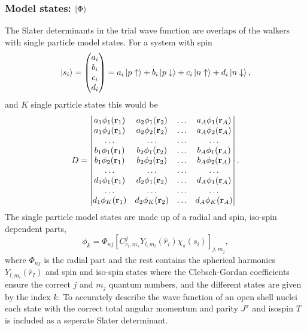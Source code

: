 \subsubsection{Model states: $\left| \Phi \right>$}
The Slater determinants in the trial wave function are overlaps of the walkers with single particle model states. For a system with spin
\begin{equation}
   \left| s_i \right> = \begin{pmatrix} a_i \\ b_i \\ c_i \\ d_i \end{pmatrix}
   = a_i\left| p\uparrow \right> + b_i \left| p\downarrow \right> + c_i\left| n\uparrow \right> + d_i\left| n\downarrow \right>,
\end{equation}
and $K$ single particle states this would be
\begin{equation}
   D = 
   \begin{vmatrix}
      a_1\phi_1(\mathbf{r}_1) & a_2\phi_1(\mathbf{r}_2) & \ldots & a_A\phi_1(\mathbf{r}_A) \\
      a_1\phi_2(\mathbf{r}_1) & a_2\phi_2(\mathbf{r}_2) & \ldots & a_A\phi_2(\mathbf{r}_A) \\
      \ldots & \ldots & \ldots & \ldots \\
      b_1\phi_1(\mathbf{r}_1) & b_2\phi_1(\mathbf{r}_2) & \ldots & b_A\phi_1(\mathbf{r}_A) \\
      b_1\phi_2(\mathbf{r}_1) & b_2\phi_2(\mathbf{r}_2) & \ldots & b_A\phi_2(\mathbf{r}_A) \\
      \ldots & \ldots & \ldots & \ldots \\
      d_1\phi_1(\mathbf{r}_1) & d_2\phi_1(\mathbf{r}_2) & \ldots & d_A\phi_1(\mathbf{r}_A) \\
      \ldots & \ldots & \ldots & \ldots \\
      d_1\phi_K(\mathbf{r}_1) & d_2\phi_K(\mathbf{r}_2) & \ldots & d_A\phi_K(\mathbf{r}_A) \\
\end{vmatrix}.
\end{equation}
The single particle model states are made up of a radial and spin, iso-spin dependent parts,
\begin{equation}
   \phi_k = \Phi_{nj}\left[C_{c_l,m_s}^j Y_{l,m_l}(\hat{r}_i)\chi_s(s_i)\right]_{j,m_j},
\end{equation}
where $\Phi_{nj}$ is the radial part and the rest contains the spherical harmonics $Y_{l,m_l}(\hat{r}_I)$ and spin and iso-spin states where the Clebsch-Gordan coefficients ensure the correct $j$ and $m_j$ quantum numbers, and the different states are given by the index $k$. To accurately describe the wave function of an open shell nuclei each state with the correct total angular momentum and parity $J^\pi$ and isospin $T$ is included as a seperate Slater determinant.

